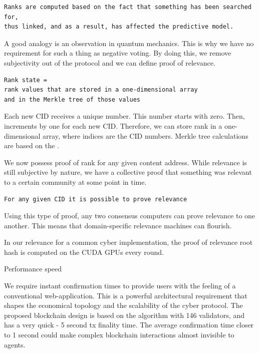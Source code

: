 \documentclass[8pt,oneside]{amsart}
\makeatletter
\newcommand{\linkgreen}[2]{\href{#1}{\color{green}{#2}}}
\renewcommand\subsection{\@startsection{subsection}
                                    {2}{\z@}
                                    {-3.25ex\@plus -1ex \@minus -.2ex}
                                    {0ex \@plus .2ex}
                                    {\play\Large}
                        }
\newcommand{\titleSection}[1]{\subsection{#1}}
\newcommand{\code}[1]{{\PlayBold #1}}
\makeatother
\begin{document}
\begin{lstlisting}
Ranks are computed based on the fact that something has been searched for,
thus linked, and as a result, has affected the predictive model.
\end{lstlisting}

A good analogy is an observation in quantum mechanics. This is why we have no requirement for such a thing as negative voting. By doing this, we remove subjectivity out of the protocol and we can define proof of relevance.

\begin{lstlisting}
Rank state =
rank values that are stored in a one-dimensional array
and in the Merkle tree of those values
\end{lstlisting}

Each new CID receives a unique number. This number starts with zero. Then, increments by one for each new CID. Therefore, we can store rank in a one-dimensional array, where indices are the CID numbers. Merkle tree calculations are based on the \linkgreen{https://tools.ietf.org/html/rfc6962#section-2.1}{RFC-6962 standard}.

We now possess proof of rank for any given content address. While relevance is still subjective by nature, we have a collective proof that something was relevant to a certain community at some point in time.

\begin{lstlisting}
For any given CID it is possible to prove relevance
\end{lstlisting}

Using this type of proof, any two \linkgreen{https://ipfs.io/ipfs/QmdCeixQUHBjGnKfwbB1dxf4X8xnadL8xWmmEnQah5n7x2}{IBC compatible} consensus computers can prove relevance to one another. This means that domain-specific relevance machines can flourish.

In our relevance for a common \code{cyber} implementation, the proof of relevance root hash is computed on the CUDA GPUs every round.

\titleSection{Performance speed}\label{Performance speed}

We require instant confirmation times to provide users with the feeling of a conventional web-application. This is a powerful architectural requirement that shapes the economical topology and the scalability of the cyber protocol. The proposed blockchain design is based on the \linkgreen{https://ipfs.io/ipfs/QmaMtD7xDgghqgjN62zWZ5TBGFiEjGQtuZBjJ9sMh816KJ}{Tendermint consensus} algorithm with 146 validators, and has a very quick - 5 second tx finality time. The average confirmation time closer to 1 second could make complex blockchain interactions almost invisible to agents.
\end{document}
